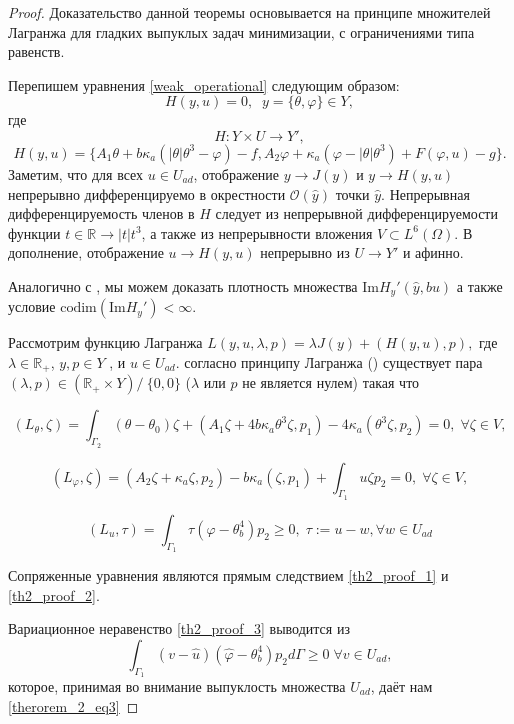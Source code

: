 \documentclass[12pt,a4paper]{article}%
\begin{document}
    \begin{proof}

        Доказательство данной теоремы основывается на принципе множителей Лагранжа для гладких выпуклых задач минимизации, с ограничениями типа равенств.

        Перепишем уравнения \eqref{weak_operational} следующим образом:
        $$H(y,u) = 0,\;\; y = \{\theta,\varphi\} \in Y,$$
        где
        $$ H:Y \times U \to Y', $$
        $$H(y,u) =\{A_1 \theta + b \kappa_a (| \theta | \theta^3 - \varphi ) - f, A_2 \varphi + \kappa_a (\varphi - |\theta|\theta^3) + F(\varphi, u) - g \}.$$
        Заметим, что для всех $u \in U_{ad}$, отображение $y \to J(y) $ и $y \to H(y,u)$ непрерывно дифференцируемо в окрестности $\mathcal{O}(\hat{y})$ точки $\hat{y}$. Непрерывная дифференцируемость членов в $H$ следует из непрерывной дифференцируемости функции $t \in \mathbb{R} \to | t | t^3$, а также из непрерывности вложения  $V \subset L^6(\Omega)$.
        В дополнение, отображение $u \to H(y,u)$ непрерывно из $U \to Y'$ и афинно.

        Аналогично с \cite[Th.2]{theorem_2_proof}, мы можем доказать плотность множества
         $\text{Im}H_y'(\hat{y},b u)$
        а также условие $\text{codim}(\text{Im}H_y') < \infty$.

        Рассмотрим функцию Лагранжа
        $L(y,u,\lambda,p) = \lambda J(y) + (H(y,u),p),$
        где $\lambda \in \mathbb{R}_+$, $y,p \in Y$ , и $u \in U_{ad}$. согласно принципу Лагранжа (\cite[Ch.2 Th.1.5]{theorem_proof_18}) существует пара $(\lambda, p) \in (\mathbb{R}_+ \times Y ) /\ \{0,0\}$
        ($\lambda$ или $p$ не является нулем) такая что

        \begin{equation}
            \label{th2_proof_1}
            (L_\theta,\zeta) = \int_{\Gamma_2}(\theta -\theta_0) \zeta+ (A_1 \zeta + 4b\kappa_a \theta^3 \zeta,p_1) - 4\kappa_a(\theta^3 \zeta,p_2) = 0, \; \forall \zeta \in V,
        \end{equation}

        \begin{equation}
            \label{th2_proof_2}
            (L_\varphi, \zeta) = (A_2 \zeta + \kappa_a \zeta, p_2) - b \kappa_a(\zeta,p_1) + \int_{\Gamma_1} u  \zeta p_2 = 0, \; \forall \zeta \in V,
        \end{equation}

        \begin{equation}
            \label{th2_proof_3}
            (L_u,\tau) = \int_{\Gamma_1} \tau (\varphi - \theta^4_b) p_2 \ge 0, \; \tau := u - w, \forall w \in U_{ad}
        \end{equation}

        Сопряженные уравнения являются прямым следствием \eqref{th2_proof_1} и \eqref{th2_proof_2}.

        Вариационное неравенство \eqref{th2_proof_3} выводится из
        $$\int_{\Gamma_1} (v -\hat{u})(\hat{\varphi} - \theta^4_b)p_2 d\Gamma \ge 0 \; \forall  v \in U_{ad}, $$
        которое, принимая во внимание выпуклость множества $U_{ad}$, даёт нам \eqref{therorem_2_eq3}

    \end{proof}
\end{document}
